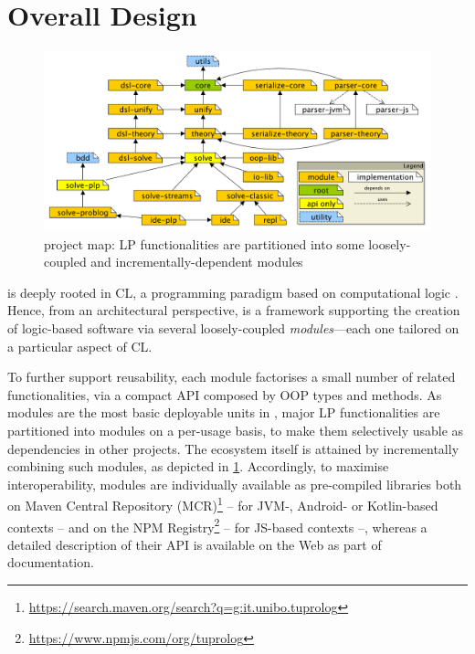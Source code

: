 \documentclass[12pt,a4paper,openright,twoside]{book}
\begin{document}
\section{Overall Design}
\label{ssec:sw-architecture}

\begin{figure}
    \centering
    \includegraphics[width=\linewidth]{figures/2p-kt-project-map.pdf}
    \caption{\twopkt{} project map: LP functionalities are partitioned into some loosely-coupled and incrementally-dependent modules}
    \label{fig:2p-kt-project-map}
\end{figure}

\twopkt{} is deeply rooted in CL, a programming paradigm based on computational logic \cite{lloyd1990computational,Nerode1996}.
%
Hence, from an architectural perspective, \twopkt{} is a framework supporting the creation of logic-based software via several loosely-coupled \emph{modules}---each one tailored on a particular aspect of CL.

To further support reusability, each module factorises a small number of related functionalities, via a compact API composed by OOP types and methods.
%
As modules are the most basic deployable units in \twopkt{}, major LP functionalities are partitioned into modules on a per-usage basis, to make them selectively usable as dependencies in other projects.
%
The \twopkt{} ecosystem itself is attained by incrementally combining such modules, as depicted in \cref{fig:2p-kt-project-map}.
%
Accordingly, to maximise interoperability, \twopkt{} modules are individually available as pre-compiled libraries both on Maven Central Repository (MCR)\footnote{\url{https://search.maven.org/search?q=g:it.unibo.tuprolog}} -- for JVM-, Android- or Kotlin-based contexts -- and on the NPM Registry\footnote{\url{https://www.npmjs.com/org/tuprolog}} -- for JS-based contexts --, whereas a detailed description of their API is available on the Web as part of \twopkt{} documentation.
%
\end{document}
